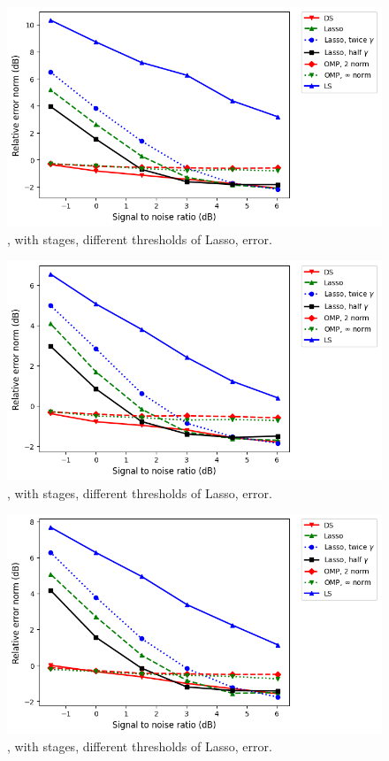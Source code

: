 %
\begin {figure} [H]
\includegraphics [width = 0.8 \textwidth] {error-medium-more-square-six-lasso.png}
\caption {, with  stages, different thresholds of Lasso, error.}
\end {figure}
%
\begin {figure} [H]
\includegraphics [width = 0.8 \textwidth] {error-medium-more-wide-six-lasso.png}
\caption {, with  stages, different thresholds of Lasso, error.}
\end {figure}
%
\begin {figure} [H]
\includegraphics [width = 0.8 \textwidth] {error-medium-more-tall-six-lasso.png}
\caption {, with  stages, different thresholds of Lasso, error.}
\end {figure}

